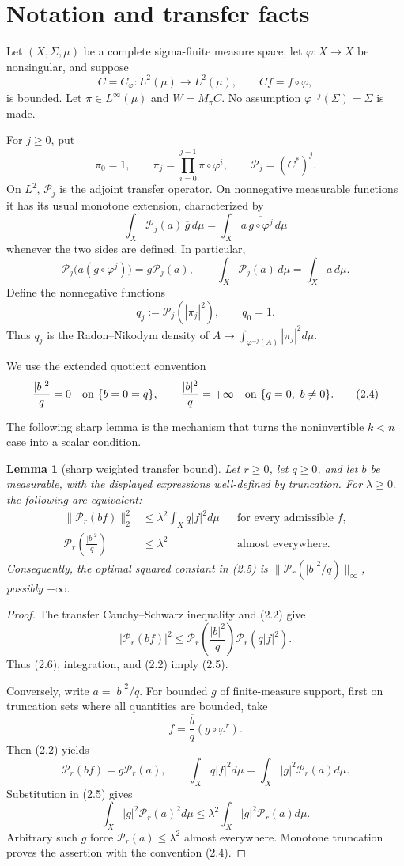\documentclass[11pt]{article}
\newtheorem{lemma}[theorem]{Lemma}
\newcommand{\Perr}{\mathcal P}
\newcommand{\1}{\mathbf 1}
\begin{document}
\section{Notation and transfer facts}

Let $(X,\Sigma,\mu)$ be a complete sigma-finite measure space, let
$\varphi:X\to X$ be nonsingular, and suppose
\[
 C=C_\varphi:L^2(\mu)\to L^2(\mu),\qquad Cf=f\circ\varphi,
\]
is bounded.  Let $\pi\in L^\infty(\mu)$ and
$W=M_\pi C$.  No assumption $\varphi^{-j}(\Sigma)=\Sigma$ is made.

For $j\ge0$, put
\[
 \pi_0=1,\qquad
 \pi_j=\prod_{i=0}^{j-1}\pi\circ\varphi^i,
 \qquad \Perr_j=(C^*)^j.
\]
On $L^2$, $\Perr_j$ is the adjoint transfer operator.  On nonnegative
measurable functions it has its usual monotone extension, characterized by
\[
 \int_X \Perr_j(a)\,\overline g\,d\mu
   =\int_X a\,\overline{g\circ\varphi^j}\,d\mu
 \tag{2.1}
\]
whenever the two sides are defined.  In particular,
\[
 \Perr_j\bigl(a(g\circ\varphi^j)\bigr)=g\Perr_j(a),
 \qquad
 \int_X\Perr_j(a)\,d\mu=\int_Xa\,d\mu.
 \tag{2.2}
\]
Define the nonnegative functions
\[
 q_j:=\Perr_j(|\pi_j|^2),\qquad q_0=1.
 \tag{2.3}
\]
Thus $q_j$ is the Radon--Nikodym density of
$A\mapsto\int_{\varphi^{-j}(A)}|\pi_j|^2d\mu$.

We use the extended quotient convention
\[
 \frac{|b|^2}{q}=0\quad\hbox{on }\{b=0=q\},
 \qquad
 \frac{|b|^2}{q}=+\infty\quad\hbox{on }\{q=0,\ b\ne0\}.
 \tag{2.4}
\]

The following sharp lemma is the mechanism that turns the noninvertible
$k<n$ case into a scalar condition.

\begin{lemma}[sharp weighted transfer bound]\label{lem:transfer}
Let $r\ge0$, let $q\ge0$, and let $b$ be measurable, with the displayed
expressions well-defined by truncation.  For $\lambda\ge0$, the following are
equivalent:
\begin{align*}
 \|\Perr_r(bf)\|_2^2
   &\le \lambda^2\int_X q|f|^2d\mu
      &&\text{for every admissible }f, \tag{2.5}\\
 \Perr_r\left(\frac{|b|^2}{q}\right)
   &\le\lambda^2
      &&\text{almost everywhere}. \tag{2.6}
\end{align*}
Consequently, the optimal squared constant in (2.5) is
$\|\Perr_r(|b|^2/q)\|_\infty$, possibly $+\infty$.
\end{lemma}

\begin{proof}
The transfer Cauchy--Schwarz inequality and (2.2) give
\[
 |\Perr_r(bf)|^2
 \le \Perr_r\left(\frac{|b|^2}{q}\right)\Perr_r(q|f|^2).
\]
Thus (2.6), integration, and (2.2) imply (2.5).

Conversely, write $a=|b|^2/q$.  For bounded $g$ of finite-measure support,
first on truncation sets where all quantities are bounded, take
\[
 f=\frac{\overline b}{q}(g\circ\varphi^r).
\]
Then (2.2) yields
\[
 \Perr_r(bf)=g\Perr_r(a),\qquad
 \int_Xq|f|^2d\mu=\int_X|g|^2\Perr_r(a)d\mu.
\]
Substitution in (2.5) gives
\[
 \int_X|g|^2\Perr_r(a)^2d\mu
 \le\lambda^2\int_X|g|^2\Perr_r(a)d\mu.
\]
Arbitrary such $g$ force $\Perr_r(a)\le\lambda^2$ almost everywhere.
Monotone truncation proves the assertion with the convention (2.4).
\end{proof}
\end{document}
